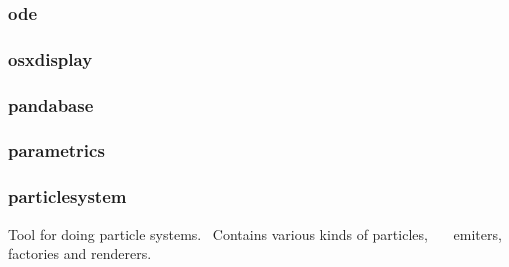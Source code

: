 \documentclass[a4paper]{article}
\begin{document}
\clearpage\subsubsection[ode]{ode}
\hypertarget{RefHeading21891167907073}{}\subsubsection{}
\clearpage\subsubsection[osxdisplay]{osxdisplay}
\hypertarget{RefHeading21911167907073}{}\subsubsection{}
\clearpage\subsubsection[pandabase]{pandabase}
\hypertarget{RefHeading21931167907073}{}\subsubsection{}
\clearpage\subsubsection[parametrics]{parametrics}
\hypertarget{RefHeading21951167907073}{}\subsubsection{}
\clearpage\subsubsection[particlesystem]{particlesystem}
\hypertarget{RefHeading21971167907073}{}{\color{black}
Tool for doing particle systems. \ Contains various kinds of particles,\newline
 \ \ \ emiters, factories and renderers.}
\end{document}
